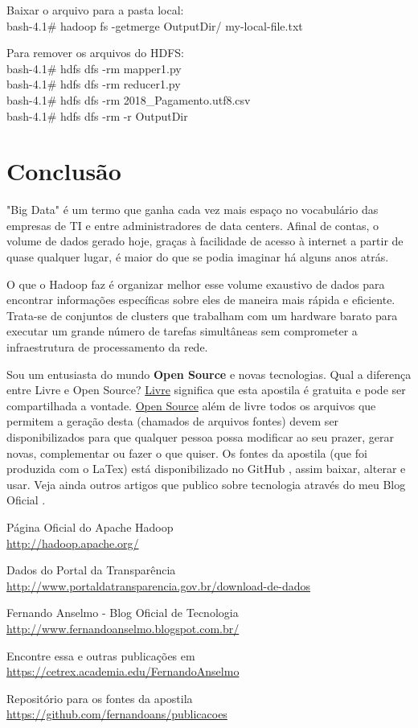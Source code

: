 \documentclass[a4paper,11pt]{article}
\begin{document}
Baixar o arquivo para a pasta local: \\
{\ttfamily bash-4.1\# hadoop fs -getmerge OutputDir/ my-local-file.txt}

Para remover os arquivos do HDFS: \\
{\ttfamily bash-4.1\# hdfs dfs -rm mapper1.py \\
bash-4.1\# hdfs dfs -rm reducer1.py \\
bash-4.1\# hdfs dfs -rm 2018\_Pagamento.utf8.csv \\
bash-4.1\# hdfs dfs -rm -r OutputDir}

\section{Conclusão}
"Big Data" é um termo que ganha cada vez mais espaço no vocabulário das empresas de TI e entre administradores de data centers. Afinal de contas, o volume de dados gerado hoje, graças à facilidade de acesso à internet a partir de quase qualquer lugar, é maior do que se podia imaginar há alguns anos atrás.

O que o Hadoop faz é organizar melhor esse volume exaustivo de dados para encontrar informações específicas sobre eles de maneira mais rápida e eficiente. Trata-se de conjuntos de clusters que trabalham com um hardware barato para executar um grande número de tarefas simultâneas sem comprometer a infraestrutura de processamento da rede. 

Sou um entusiasta do mundo \textbf{Open Source} e novas tecnologias. Qual a diferença entre Livre e Open Source? \underline{Livre} significa que esta apostila é gratuita e pode ser compartilhada a vontade. \underline{Open Source} além de livre todos os arquivos que permitem a geração desta (chamados de arquivos fontes) devem ser disponibilizados para que qualquer pessoa possa modificar ao seu prazer, gerar novas, complementar ou fazer o que quiser. Os fontes da apostila (que foi produzida com o LaTex) está disponibilizado no GitHub \cite{github}, assim baixar, alterar e usar. Veja ainda outros artigos que publico sobre tecnologia através do meu Blog Oficial \cite{fernandoanselmo}.

\begin{thebibliography}{5}
	Página Oficial do Apache Hadoop \\
	\url{http://hadoop.apache.org/}
	
	Dados do Portal da Transparência \\
	\url{http://www.portaldatransparencia.gov.br/download-de-dados}
	
	Fernando Anselmo - Blog Oficial de Tecnologia \\
	\url{http://www.fernandoanselmo.blogspot.com.br/}

	Encontre essa e outras publicações em \\
	\url{https://cetrex.academia.edu/FernandoAnselmo}

	Repositório para os fontes da apostila \\
	\url{https://github.com/fernandoans/publicacoes}	
	\end{thebibliography}
\end{document}
